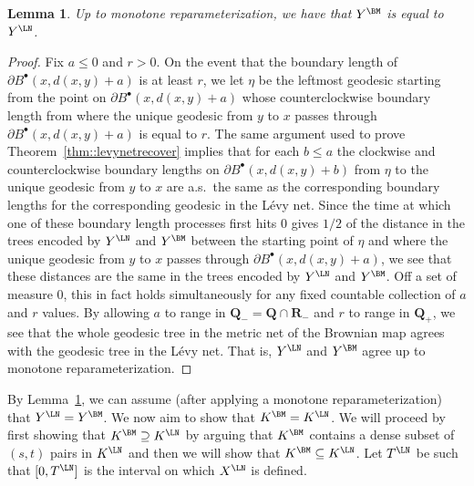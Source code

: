 \documentclass[10pt]{amsart}
\newcommand{\sbullet}{{\scriptscriptstyle\bullet}}
\theoremstyle{plain}
\numberwithin{theorem}{section}
\newtheorem{lemma}[theorem]{Lemma}
\theoremstyle{definition}
\newcommand{\R}{\mathbf{R}}
\newcommand{\Q}{{\mathbf Q}}
\newcommand{\fb}[2]{B^\sbullet(#1,#2)}
\begin{document}
\begin{lemma}
\label{lem:geodesic_tree_is_the_same}
Up to monotone reparameterization, we have that $Y^\BM$ is equal to~$Y^\LN$.
\end{lemma}
\begin{proof}
Fix $a \leq 0$ and $r > 0$. On the event that the boundary length of $\partial \fb{x}{d(x,y)+a}$ is at least $r$, we let $\eta$ be the leftmost geodesic starting from the point on $\partial \fb{x}{d(x,y)+a}$ whose counterclockwise boundary length from where the unique geodesic from $y$ to $x$ passes through $\partial \fb{x}{d(x,y)+a}$ is equal to $r$. The same argument used to prove Theorem~\ref{thm::levynetrecover} implies that for each $b \leq a$ the clockwise and counterclockwise boundary lengths on $\partial \fb{x}{d(x,y)+b}$ from $\eta$ to the unique geodesic from $y$ to $x$ are a.s.\ the same as the corresponding boundary lengths for the corresponding geodesic in the Lévy net. Since the time at which one of these boundary length processes first hits $0$ gives $1/2$ of the distance in the trees encoded by $Y^\LN$ and $Y^\BM$ between the starting point of $\eta$ and where the unique geodesic from $y$ to $x$ passes through $\partial \fb{x}{d(x,y)+a}$, we see that these distances are the same in the trees encoded by $Y^\LN$ and $Y^\BM$. Off a set of measure $0$, this in fact holds simultaneously for any fixed countable collection of $a$ and $r$ values. By allowing $a$ to range in $\Q_- = \Q \cap \R_-$ and $r$ to range in $\Q_+$, we see that the whole geodesic tree in the metric net of the Brownian map agrees with the geodesic tree in the Lévy net. That is, $Y^\LN$ and $Y^\BM$ agree up to monotone reparameterization.
\end{proof}

By Lemma~\ref{lem:geodesic_tree_is_the_same}, we can assume (after applying a monotone reparameterization) that $Y^\LN = Y^\BM$. We now aim to show that $K^\BM = K^\LN$. We will proceed by first showing that $K^\BM \supseteq K^\LN$ by arguing that $K^\BM$ contains a dense subset of $(s,t)$ pairs in $K^\LN$ and then we will show that $K^\BM \subseteq K^\LN$. Let $T^\LN$ be such that $[0,T^\LN]$ is the interval on which $X^\LN$ is defined.
\end{document}
